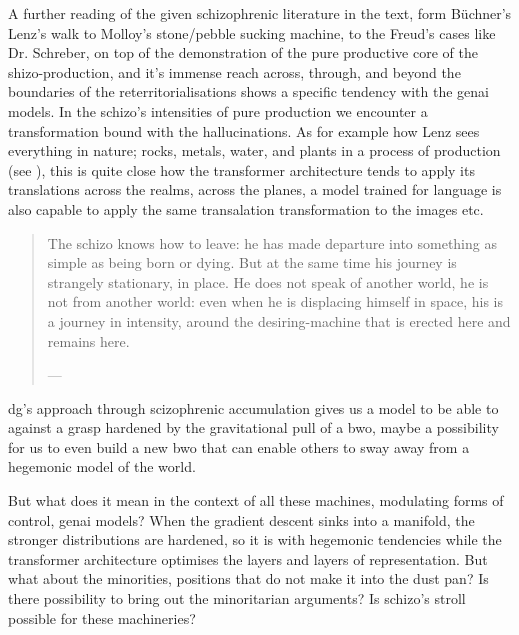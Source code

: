 \begin{orangebox}
	A further reading of the given schizophrenic literature in the text, form
	Büchner's Lenz's walk to Molloy's stone/pebble sucking machine, to the Freud's
	cases like Dr. Schreber, on top of the demonstration of the pure productive
	core of the shizo-production, and it's immense reach across, through, and
	beyond the boundaries of the reterritorialisations shows a specific tendency
	with the \gls{genai} models. In the schizo's intensities of pure production we
	encounter a transformation bound with the hallucinations. As for example how Lenz sees everything in nature; rocks, metals, water, and plants in a process of production (see \cite[41]{buchanan2008b}), this is quite close how the transformer architecture tends to apply its translations across the realms, across the planes, a model trained for language is also capable to apply the same transalation transformation to the images etc.
\end{orangebox}




\begin{quote}
	The schizo knows how to leave: he has made departure into something as simple as being born or dying. But at the same time his journey is strangely stationary, in place. He does not speak of another world, he is not from another world: even when he is displacing himself in space, his is a journey in intensity, around the desiring-machine that is erected here and remains here.

	— \cite[131]{deleuze1983}
\end{quote}


\begin{redbox}

\gls{dg}'s approach through scizophrenic accumulation gives us a model to be
able to against a grasp hardened by the gravitational pull of a \gls{bwo},
maybe a possibility for us to even build a new \gls{bwo} that can enable others
to sway away from a hegemonic model of the world. 

But what does it mean in the
context of all these machines, modulating forms of control, \gls{genai} models? When the gradient descent sinks into a manifold, the stronger distributions are hardened, so it is with hegemonic tendencies while the transformer architecture optimises the layers and layers of representation. But what about the minorities, positions that do not make it into the dust pan? Is there possibility to bring out the minoritarian arguments? Is schizo's stroll possible for these machineries?

\end{redbox}


